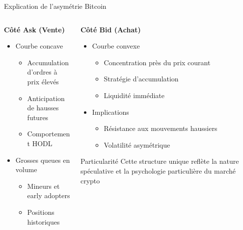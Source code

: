 \documentclass[aspectratio=169]{beamer}  %
\begin{document}
\begin{frame}{Explication de l'asymétrie Bitcoin}
    \begin{columns}
        \begin{column}{0.5\textwidth}
            \textbf{Côté Ask (Vente)}
            \begin{itemize}
                \item \small{Courbe concave}
                \begin{itemize}
                    \item \footnotesize{Accumulation d'ordres à prix élevés}
                    \item \footnotesize{Anticipation de hausses futures}
                    \item \footnotesize{Comportement HODL}
                \end{itemize}
                \item \small{Grosses queues en volume}
                \begin{itemize}
                    \item \footnotesize{Mineurs et early adopters}
                    \item \footnotesize{Positions historiques}
                \end{itemize}
            \end{itemize}
        \end{column}
        \begin{column}{0.5\textwidth}
            \textbf{Côté Bid (Achat)}
            \begin{itemize}
                \item \small{Courbe convexe}
                \begin{itemize}
                    \item \footnotesize{Concentration près du prix courant}
                    \item \footnotesize{Stratégie d'accumulation}
                    \item \footnotesize{Liquidité immédiate}
                \end{itemize}
                \item \small{Implications}
                \begin{itemize}
                    \item \footnotesize{Résistance aux mouvements haussiers}
                    \item \footnotesize{Volatilité asymétrique}
                \end{itemize}
            \end{itemize}
            \begin{alertblock}{Particularité}
                Cette structure unique reflète la nature spéculative et la psychologie particulière du marché crypto
            \end{alertblock}
        \end{column}
    \end{columns}
\end{frame}
\end{document}
